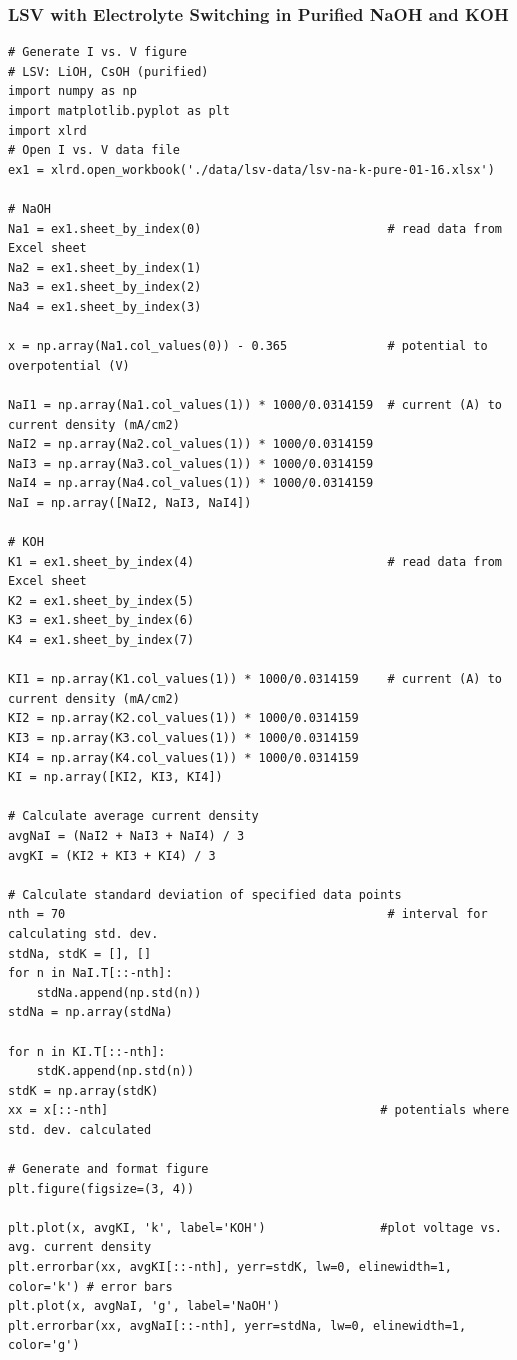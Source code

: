 \documentclass[journal=jpccck,manuscript=suppinfo,email=true]{achemso}
\begin{document}
\subsubsection{LSV with Electrolyte Switching in Purified NaOH and KOH}
\label{sec-6-1-3}
\begin{verbatim}
# Generate I vs. V figure
# LSV: LiOH, CsOH (purified)
import numpy as np
import matplotlib.pyplot as plt
import xlrd
# Open I vs. V data file
ex1 = xlrd.open_workbook('./data/lsv-data/lsv-na-k-pure-01-16.xlsx')

# NaOH
Na1 = ex1.sheet_by_index(0)                          # read data from Excel sheet
Na2 = ex1.sheet_by_index(1)
Na3 = ex1.sheet_by_index(2)
Na4 = ex1.sheet_by_index(3)

x = np.array(Na1.col_values(0)) - 0.365              # potential to overpotential (V)

NaI1 = np.array(Na1.col_values(1)) * 1000/0.0314159  # current (A) to current density (mA/cm2)
NaI2 = np.array(Na2.col_values(1)) * 1000/0.0314159
NaI3 = np.array(Na3.col_values(1)) * 1000/0.0314159
NaI4 = np.array(Na4.col_values(1)) * 1000/0.0314159
NaI = np.array([NaI2, NaI3, NaI4])

# KOH
K1 = ex1.sheet_by_index(4)                           # read data from Excel sheet
K2 = ex1.sheet_by_index(5)
K3 = ex1.sheet_by_index(6)
K4 = ex1.sheet_by_index(7)

KI1 = np.array(K1.col_values(1)) * 1000/0.0314159    # current (A) to current density (mA/cm2)
KI2 = np.array(K2.col_values(1)) * 1000/0.0314159
KI3 = np.array(K3.col_values(1)) * 1000/0.0314159
KI4 = np.array(K4.col_values(1)) * 1000/0.0314159
KI = np.array([KI2, KI3, KI4])

# Calculate average current density
avgNaI = (NaI2 + NaI3 + NaI4) / 3
avgKI = (KI2 + KI3 + KI4) / 3

# Calculate standard deviation of specified data points
nth = 70                                             # interval for calculating std. dev.
stdNa, stdK = [], []
for n in NaI.T[::-nth]:
    stdNa.append(np.std(n))
stdNa = np.array(stdNa)

for n in KI.T[::-nth]:
    stdK.append(np.std(n))
stdK = np.array(stdK)
xx = x[::-nth]                                      # potentials where std. dev. calculated

# Generate and format figure
plt.figure(figsize=(3, 4))

plt.plot(x, avgKI, 'k', label='KOH')                #plot voltage vs. avg. current density
plt.errorbar(xx, avgKI[::-nth], yerr=stdK, lw=0, elinewidth=1, color='k') # error bars
plt.plot(x, avgNaI, 'g', label='NaOH')
plt.errorbar(xx, avgNaI[::-nth], yerr=stdNa, lw=0, elinewidth=1, color='g')


\end{verbatim}
\end{document}
